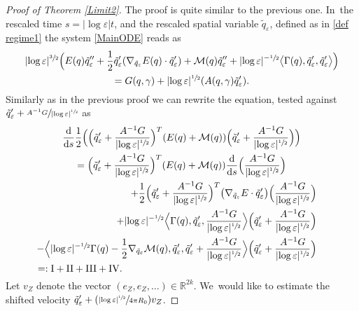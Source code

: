 \documentclass[JEP,XML,SOM,Unicode,published]{cedram}
\let\epsilon\varepsilon
\newcommand{\Psfrac}[2]{(\sfrac{#1}{#2})}
\newcommand{\rI}{\mathrm{I}}
\newcommand{\rII}{\mathrm{II}}
\newcommand{\rIII}{\mathrm{III}}
\newcommand{\rIV}{\mathrm{IV}}
\theoremstyle{definition}
\newcommand\R{\mathbb{R}}
\newcommand\eq{=}
\let\eps\epsilon
\let\mel\relax
\begin{document}
\begin{proof}[Proof of Theorem \ref{Limit2}]
The proof is quite similar to the previous one. In~the rescaled time $s=|{\log\eps}|t$, and the rescaled spatial variable $\tilde{q}_\eps$, defined as in \eqref{def regime1} the system \eqref{MainODE} reads as
\begin{multline}\label{rescaled ODE 2}
|{\log\eps}|^{\sfrac{3}{2}}\Bigl(E(q)\tilde{q}_{\eps}''+\frac{1}{2}\tilde{q}_{\eps}'(\nabla_{\tilde{q}_\eps}E(q)\cdot\tilde{q}_{\eps}')+\mathcal{M}(q)\tilde{q}_\eps''+|{\log\eps}|^{-\sfrac{1}{2}}\bigl\langle\Gamma(q),\tilde{q}_{\eps}',\tilde{q}_{\eps}'\bigr\rangle \Bigr)\\
\eq G(q,\gamma)+|{\log\eps}|^{\sfrac{1}{2}}(A(q,\gamma)\tilde{q}_{\eps}').
\end{multline}
Similarly as in the previous proof we can rewrite the equation, tested against $\tilde{q}_\eps'+\sfrac{A^{-1}G}{|{\log\eps}|^{\sfrac{1}{2}}}$ as
\begin{multline*}
\mel\frac{\text{d}}{\text{d}s}\frac{1}{2}\Bigl(\Bigl(\tilde{q}_\eps'+\frac{A^{-1}G}{|{\log\eps}|^{\sfrac{1}{2}}}\Bigr)^T(E(q)+\mathcal{M}(q))\Bigl(\tilde{q}_\eps'+\frac{A^{-1}G}{|{\log\eps}|^{\sfrac{1}{2}}}\Bigr)\Bigr)\\
=\Bigl(\tilde{q}_\eps'+\frac{A^{-1}G}{|{\log\eps}|^{\sfrac{1}{2}}}\Bigr)^T(E(q)+\mathcal{M}(q))\frac{\text{d}}{\text{d}s}\Bigl(\frac{A^{-1}G}{|{\log\eps}|^{\sfrac{1}{2}}}\Bigr)\\
\shoveright{+\frac{1}{2}\Bigl(\tilde{q}_\eps'+\frac{A^{-1}G}{|{\log\eps}|^{\sfrac{1}{2}}}\Bigr)^T\bigl(\nabla_{\tilde{q}_\eps}E\cdot\tilde{q}_\eps'\bigr)\Bigl(\frac{A^{-1}G}{|{\log\eps}|^{\sfrac{1}{2}}}\Bigr)}\\
\shoveright{+|{\log\eps}|^{-\sfrac{1}{2}}\Bigl\langle \Gamma(q),\tilde{q}_\eps',\frac{A^{-1}G}{|{\log\eps}|^{\sfrac{1}{2}}}\Bigr\rangle\Bigl(\tilde{q}_\eps'+\frac{A^{-1}G}{|{\log\eps}|^{\sfrac{1}{2}}}\Bigr)}\\
\shoveright{-\Bigl\langle |{\log\eps}|^{-\sfrac{1}{2}}\Gamma(q)-\frac{1}{2}\nabla_{\tilde{q}_\eps}\mathcal{M}(q),\tilde{q}_\eps',\tilde{q}_\eps'+\frac{A^{-1}G}{|{\log\eps}|^{\sfrac{1}{2}}}\Bigr\rangle\Bigl(\tilde{q}_\eps'+\frac{A^{-1}G}{|{\log\eps}|^{\sfrac{1}{2}}}\Bigr)}\\
=:\rI+\rII+\rIII+\rIV.\hspace*{7.3cm}
\end{multline*}
Let $v_Z$ denote the vector $(e_Z,e_Z,\dots)\in \R^{2k}$. We~would like to estimate the shifted velocity $\tilde{q}_\eps'+\Psfrac{|{\log\eps}|^{\sfrac{1}{2}}}{4\pi R_0}v_Z$.

\end{proof}
\end{document}
